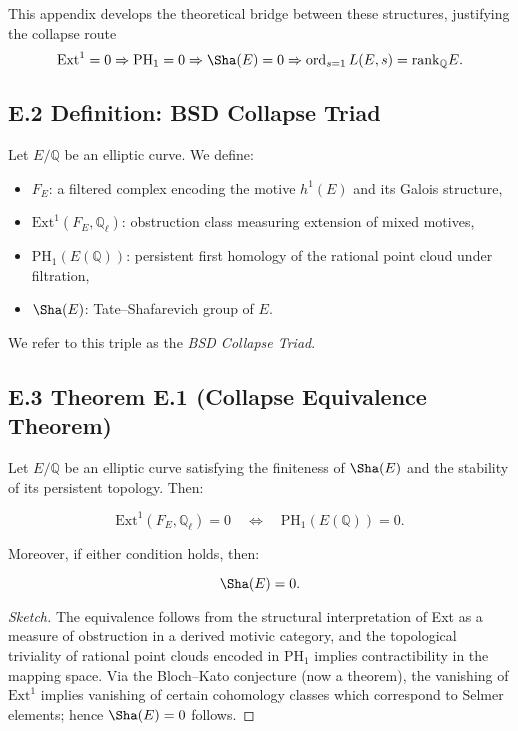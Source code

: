 This appendix develops the theoretical bridge between these structures, justifying the collapse route  
\[
\mathrm{Ext}^1 = 0 \Rightarrow \mathrm{PH}_1 = 0 \Rightarrow \Sha(E) = 0 \Rightarrow \operatorname{ord}_{s=1}L(E,s) = \mathrm{rank}_\mathbb{Q}E.
\]

\subsection*{E.2 Definition: BSD Collapse Triad}

Let \( E/\mathbb{Q} \) be an elliptic curve. We define:

\begin{itemize}
  \item \( F_E \): a filtered complex encoding the motive \( h^1(E) \) and its Galois structure,
  \item \( \mathrm{Ext}^1(F_E, \mathbb{Q}_\ell) \): obstruction class measuring extension of mixed motives,
  \item \( \mathrm{PH}_1(E(\mathbb{Q})) \): persistent first homology of the rational point cloud under filtration,
  \item \( \Sha(E) \): Tate--Shafarevich group of \( E \).
\end{itemize}

We refer to this triple as the \emph{BSD Collapse Triad}.

\subsection*{E.3 Theorem E.1 (Collapse Equivalence Theorem)}

\begin{theorem}
Let \( E/\mathbb{Q} \) be an elliptic curve satisfying the finiteness of \( \Sha(E) \) and the stability of its persistent topology. Then:

\[
\mathrm{Ext}^1(F_E, \mathbb{Q}_\ell) = 0 \quad \Longleftrightarrow \quad \mathrm{PH}_1(E(\mathbb{Q})) = 0.
\]

Moreover, if either condition holds, then:

\[
\Sha(E) = 0.
\]
\end{theorem}

\begin{proof}[Sketch]
The equivalence follows from the structural interpretation of Ext as a measure of obstruction in a derived motivic category,  
and the topological triviality of rational point clouds encoded in \( \mathrm{PH}_1 \) implies contractibility in the mapping space.  
Via the Bloch--Kato conjecture (now a theorem), the vanishing of \( \mathrm{Ext}^1 \) implies vanishing of certain cohomology classes  
which correspond to Selmer elements; hence \( \Sha(E) = 0 \) follows.
\end{proof}

